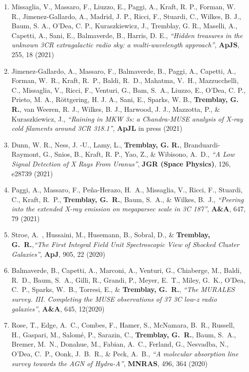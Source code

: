 \documentclass[11pt]{article}
\begin{document}
\begin{enumerate}[resume]
\item Missaglia, V., Massaro, F., Liuzzo, E., Paggi, A., Kraft, R. P., Forman, W. R., Jimenez-Gallardo, A., Madrid, J. P., Ricci, F., Stuardi, C., Wilkes, B. J., Baum, S. A., O'Dea, C. P., Kuraszkiewicz, J., Tremblay, G. R., Maselli, A., Capetti, A., Sani, E., Balmaverde, B., Harris, D. E., \textit{``Hidden treasures in the unknown 3CR extragalactic radio sky: a multi-wavelength approach''}, \textbf{ApJS}, 255, 18 (2021)

\item Jimenez-Gallardo, A., Massaro, F., Balmaverde, B., Paggi, A., Capetti, A., Forman, W.~R., Kraft, R.~P., Baldi, R.~D., Mahatma, V.~H., Mazzucchelli, C., Missaglia, V., Ricci, F., Venturi, G., Bam, S.~A., Liuzzo, E., O'Dea, C. P., Prieto, M. A., Röttgering, H. J. A., Sani, E., Sparks, W. B., \textbf{Tremblay, G. R.}, van Weeren, R. J., Wilkes, B. J., Harwood, J. J., Mazzotta, P., \& Kuraszkiewicz, J., \textit{``Raining in MKW 3s: a Chandra-MUSE analysis of X-ray cold filaments around 3CR 318.1''}, \textbf{ApJL} in press (2021)

\item Dunn, W. R., Ness, J. -U., Lamy, L., \textbf{Tremblay, G. R.}, Branduardi-Raymont, G., Snios, B., Kraft, R. P., Yao, Z., \& Wibisono, A.~D., \textit{``A Low Signal Detection of X Rays From Uranus''}, \textbf{JGR (Space Physics)}, 126, e28739 (2021)


\item Paggi, A., Massaro, F., Pe\~{n}a-Herazo, H.~A., Missaglia, V., Ricci, F., Stuardi, C., Kraft, R.~P., \textbf{Tremblay, G.~R.}, Baum, S.~A., \& Wilkes, B.~J., \textit{``Peering into the extended X-ray emission on megaparsec scale in 3C 187''}, \textbf{A\&A}, 647, 79 (2021)


\item Stroe, A.~, Hussaini, M., Husemann, B., Sobral, D., \& \textbf{Tremblay, G.~R.},\textit{``The First Integral Field Unit Spectroscopic View of Shocked Cluster Galaxies''}, \textbf{ApJ}, 905, 22 (2020)

\item Balmaverde, B., Capetti, A., Marconi, A., Venturi, G., Chiaberge, M.,
Baldi, R.~D., Baum, S.~A., Gilli, R., Grandi, P., Meyer, E.~T., Miley, G.~K.,
O'Dea, C.~P., Sparks, W.~B., Torresi, E., \& \textbf{Tremblay, G.~R.},
\textit{``The MURALES survey. III. Completing the MUSE observations of 37 3C low-z radio galaxies''},
\textbf{A\&A}, 645, 12(2020)


\item Rose, T., Edge, A.~C., Combes, F., Hamer, S., McNamara, B.~R.,
Russell, H., Gaspari, M., Salom\'{e}, P., Sarazin, C., \textbf{Tremblay, G.~R.},
Baum, S.~A., Bremer, M.~N., Donahue, M., Fabian, A.~C., Ferland, G.,
Nesvadba, N., O'Dea, C.~P., Oonk, J.~B.~R., \& Peck, A.~B.,
\textit{``A molecular absorption line survey towards the AGN of Hydra-A''},
\textbf{MNRAS}, 496, 364 (2020)



\end{enumerate}
\end{document}
